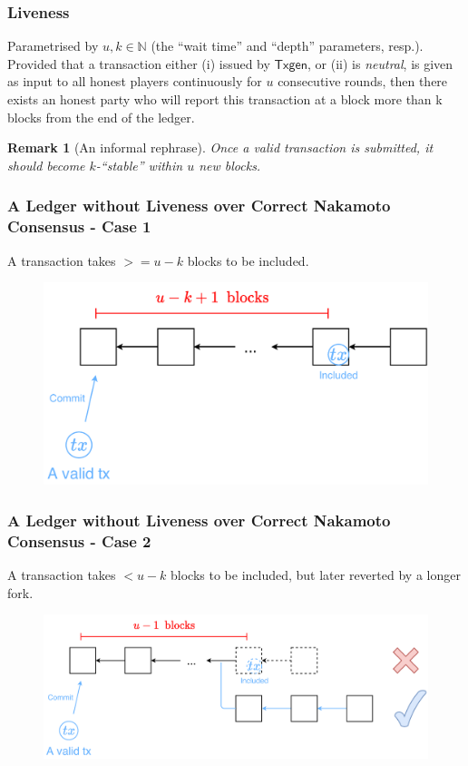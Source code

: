 \documentclass{beamer}
\newtheorem*{remark}{Remark}
\begin{document}
\begin{frame}
\frametitle{Liveness}

\begin{definition}[Liveness]
    Parametrised by $u, k \in \mathbb{N}$ (the ``wait time'' and ``depth'' parameters, resp.). Provided that a transaction either (i) issued by $\mathsf{Txgen}$, or (ii) is \emph{neutral}, is given as input to all honest players continuously for $u$ consecutive rounds, then there exists an honest party who will report this transaction at a block more than k blocks from the end of the ledger.
\end{definition}

\begin{remark}[An informal rephrase]
    Once a valid transaction is submitted, it should become $k$-``stable'' within $u$ new blocks.
\end{remark}

\end{frame}


\begin{frame}
\frametitle{A Ledger without Liveness over Correct Nakamoto Consensus - Case 1}
    
A transaction takes $>= u-k$ blocks to be included.

\begin{figure}
    \centering
    \includegraphics[width=.6\textwidth]{no-liveness-1.pdf}
\end{figure}

\end{frame}


\begin{frame}
\frametitle{A Ledger without Liveness over Correct Nakamoto Consensus - Case 2}
    
A transaction takes $< u-k$ blocks to be included, but later reverted by a longer fork.

\begin{figure}
    \centering
    \includegraphics[width=.6\textwidth]{no-liveness-2.pdf}
\end{figure}

\end{frame}
\end{document}
